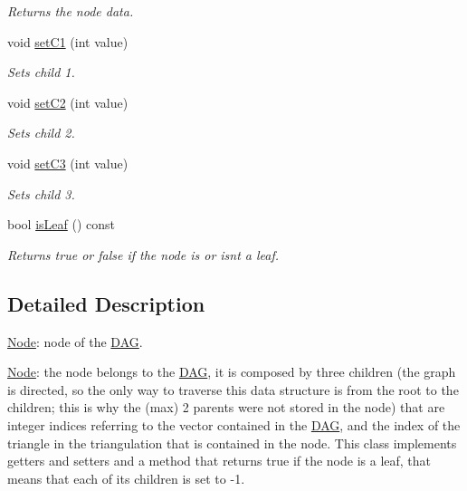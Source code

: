 \begin{DoxyCompactItemize}
\begin{DoxyCompactList}\small\item\em Returns the node data. \end{DoxyCompactList}\item 
void \hyperlink{classNode_ad6d91049f0851255bb064836405067be}{set\+C1} (int value)
\begin{DoxyCompactList}\small\item\em Sets child 1. \end{DoxyCompactList}\item 
void \hyperlink{classNode_aec5c9d9903b33dbb1bfef5b5dd351a49}{set\+C2} (int value)
\begin{DoxyCompactList}\small\item\em Sets child 2. \end{DoxyCompactList}\item 
void \hyperlink{classNode_a36d0038efe7fae34655f5c360008da6f}{set\+C3} (int value)
\begin{DoxyCompactList}\small\item\em Sets child 3. \end{DoxyCompactList}\item 
bool \hyperlink{classNode_a0c5b662d3bfbb856292a9aab878ed622}{is\+Leaf} () const
\begin{DoxyCompactList}\small\item\em Returns true or false if the node is or isn\textquotesingle{}t a leaf. \end{DoxyCompactList}\end{DoxyCompactItemize}


\subsection{Detailed Description}
\hyperlink{classNode}{Node}\+: node of the \hyperlink{classDAG}{D\+AG}. 

\hyperlink{classNode}{Node}\+: the node belongs to the \hyperlink{classDAG}{D\+AG}, it is composed by three children (the graph is directed, so the only way to traverse this data structure is from the root to the children; this is why the (max) 2 parents were not stored in the node) that are integer indices referring to the vector contained in the \hyperlink{classDAG}{D\+AG}, and the index of the triangle in the triangulation that is contained in the node. This class implements getters and setters and a method that returns true if the node is a leaf, that means that each of its children is set to -\/1. 

